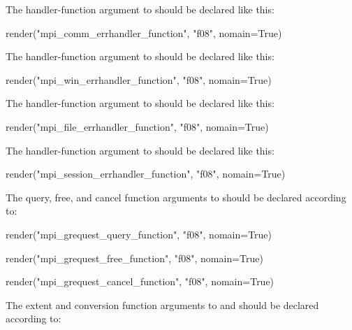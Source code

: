 %
The handler-function argument to 
should be declared like this:
%

\begin{mpi-binding}
    render("mpi_comm_errhandler_function", "f08", nomain=True)
\end{mpi-binding}

%
The handler-function argument to 
should be declared like this:
%

\begin{mpi-binding}
    render("mpi_win_errhandler_function", "f08", nomain=True)
\end{mpi-binding}

%
The handler-function argument to 
should be declared like this:
%

\begin{mpi-binding}
    render("mpi_file_errhandler_function", "f08", nomain=True)
\end{mpi-binding}

%
The handler-function argument to 
should be declared like this:
%

\begin{mpi-binding}
    render("mpi_session_errhandler_function", "f08", nomain=True)
\end{mpi-binding}

%
The query, free, and cancel function arguments to 
should be declared according to:
%

\begin{mpi-binding}
    render("mpi_grequest_query_function", "f08", nomain=True)
\end{mpi-binding}
\begin{mpi-binding}
    render("mpi_grequest_free_function", "f08", nomain=True)
\end{mpi-binding}
\begin{mpi-binding}
    render("mpi_grequest_cancel_function", "f08", nomain=True)
\end{mpi-binding}

%
The extent and conversion function arguments to 
and  should be declared  according to:
%

